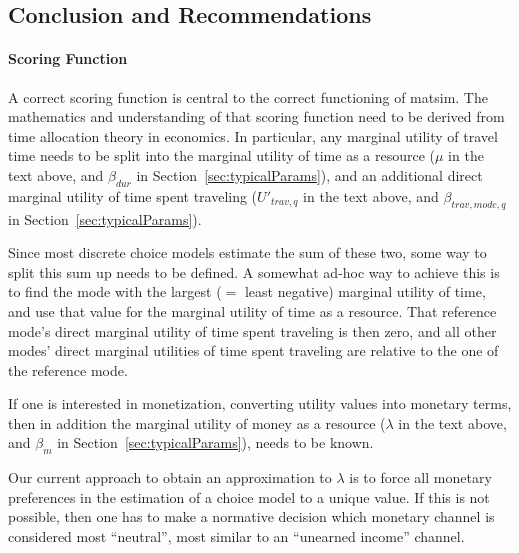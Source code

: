 
\subsection{Conclusion and Recommendations}

\paragraph*{Scoring Function}

A correct scoring function is central to the correct functioning of \acrshort{matsim}.
%
The mathematics and understanding of that scoring function need to be derived from time allocation theory in economics.  In particular, any marginal utility of travel time needs to be split into the marginal utility of time as a resource ($\mu$ in the text above, and $\beta_{dur}$ in Section~\ref{sec:typicalParams}), and an additional direct marginal utility of time spent traveling ($U'_{trav,q}$ in the text above, and $\beta_{trav,mode,q}$ in Section~\ref{sec:typicalParams}).

Since most discrete choice models estimate the sum of these two, some way to split this sum up needs to be defined.  A somewhat ad-hoc way to achieve this is to find the mode with the largest ($=$ least negative) marginal utility of time, and use that value for the marginal utility of time as a resource.  That reference mode's direct marginal utility of time spent traveling is then zero, and all other modes' direct marginal utilities of time spent traveling are relative to the one of the reference mode.

If one is interested in monetization, \ie converting utility values into monetary terms, then in addition the marginal utility of money as a resource ($\lambda$ in the text above, and $\beta_m$ in Section~\ref{sec:typicalParams}), needs to be known. 

Our current approach to obtain an approximation to $\lambda$ is to force all monetary preferences in the estimation of a choice model to a unique value.  If this is not possible, then one has to make a normative decision which monetary channel is considered most ``neutral'', \ie most similar to an ``unearned income'' channel.

